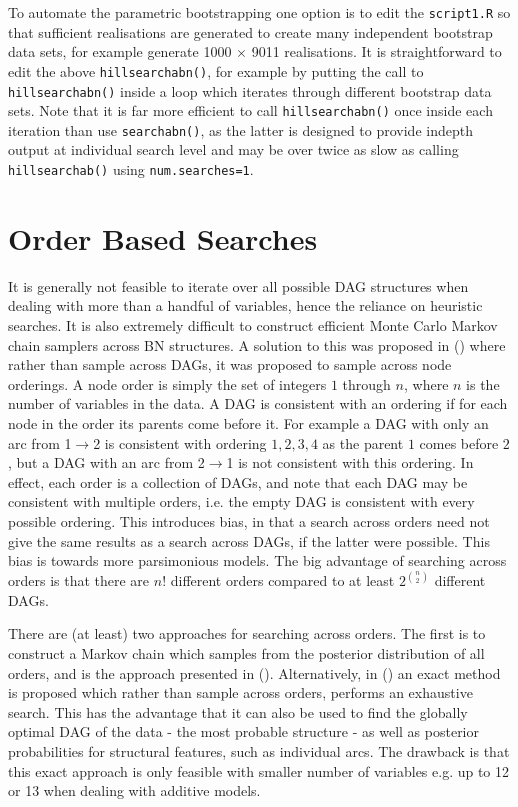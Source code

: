 \documentclass[nojss]{jss}
\begin{document}
To automate the parametric bootstrapping one option is to edit the {\tt script1.R} so that sufficient realisations are generated to create many independent bootstrap data sets, for example generate 1000 $\times$ 9011 realisations. It is straightforward to edit the above {\tt hillsearchabn()}, for example by putting the call to {\tt hillsearchabn()} inside a loop which iterates through different bootstrap data sets. Note that it is far more efficient to call {\tt hillsearchabn()} once inside each iteration than use {\tt searchabn()}, as the latter is designed to provide indepth output at individual search level and may be over twice as slow as calling {\tt hillsearchab()} using {\tt num.searches=1}.    

\section{Order Based Searches}
It is generally not feasible to iterate over all possible DAG structures when dealing with more than a handful of variables, hence the reliance on heuristic searches. It is also extremely difficult to construct efficient Monte Carlo Markov chain samplers across BN structures. A solution to this was proposed in \citeauthor{Friedman2003} (\citeyear{Friedman2003}) where rather than sample across DAGs, it was proposed to sample across node orderings. A node order is simply the set of integers $1$ through $n$, where $n$ is the number of variables in the data. A DAG is consistent with an ordering if for each node in the order its parents come before it. For example a DAG with only an arc from 1$\rightarrow$2 is consistent with ordering $1,2,3,4$ as the parent $1$ comes before $2$, but a DAG with an arc from 2$\rightarrow$1 is not consistent with this ordering. In effect, each order is a collection of DAGs, and note that each DAG may be consistent with multiple orders, i.e. the empty DAG is consistent with every possible ordering. This introduces bias, in that a search across orders need not give the same results as a search across DAGs, if the latter were possible. This bias is towards more parsimonious models. The big advantage of searching across orders is that there are $n!$ different orders compared to at least $2^{ n \choose 2 }$ different DAGs.  

There are (at least) two approaches for searching across orders. The first is to construct a Markov chain which samples from the posterior distribution of all orders, and is the approach presented in \citeauthor{Friedman2003} (\citeyear{Friedman2003}). Alternatively, in \citeauthor{Koivisto2004} (\citeyear{Koivisto2004}) an exact method is proposed which rather than sample across orders, performs an exhaustive search. This has the advantage that it can also be used to find the globally optimal DAG of the data - the most probable structure - as well as posterior probabilities for structural features, such as individual arcs. The drawback is that this exact approach is only feasible with smaller number of variables e.g. up to 12 or 13 when dealing with additive models. 
\end{document}
